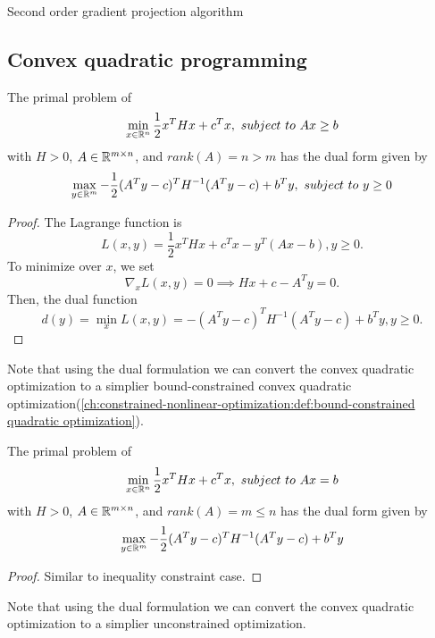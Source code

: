 \begin{refsection}
\begin{algorithm}[H]
{	}
	\caption{Second order gradient projection algorithm}
\end{algorithm}
\subsection{Convex quadratic programming}


\begin{lemma}\cite[437]{bertsekas2016nonlinear}
The primal problem of
$$\min_{x\in\mathbb{R}^n} \frac{1}{2}x^THx + c^Tx, ~subject~to~ Ax \geq b$$
with $H>0$, $A\in \mathbb{R}^{m\times  n}$, and $rank(A) = n > m$ has the dual form given by
$$\max_{y\in \mathbb{R}^m} -\frac{1}{2}(A^Ty - c)^TH^{-1}(A^Ty - c) + b^Ty, ~subject~to~ y\geq 0$$
\end{lemma}
\begin{proof}
The Lagrange function is 
$$L(x,y) = \frac{1}{2}x^THx + c^Tx - y^T(Ax - b), y\geq 0.$$
To minimize over $x$, we set $$\nabla_x L(x,y) = 0 \implies Hx + c - A^Ty = 0.$$
Then, the dual function
$$d(y) = \min_x L(x,y) = -(A^Ty - c)^T H^{-1} (A^Ty - c) + b^Ty, y\geq 0. $$
\end{proof}
\begin{remark}
	Note that using the dual formulation we can convert the convex quadratic optimization to a simplier bound-constrained convex quadratic optimization(\autoref{ch:constrained-nonlinear-optimization:def:bound-constrained quadratic optimization}).
\end{remark}

\begin{lemma}
	The primal problem of
	$$\min_{x\in\mathbb{R}^n} \frac{1}{2}x^THx + c^Tx, ~subject~to~ Ax = b$$
	with $H>0$, $A\in \mathbb{R}^{m\times  n}$, and $rank(A) = m \leq n$ has the dual form given by
	$$\max_{y\in \mathbb{R}^m} -\frac{1}{2}(A^Ty - c)^TH^{-1}(A^Ty - c) + b^Ty$$
\end{lemma}
\begin{proof}
Similar to inequality constraint case.
\end{proof}

\begin{remark}
	Note that using the dual formulation we can convert the convex quadratic optimization to a simplier unconstrained optimization.
\end{remark}




\end{refsection}
